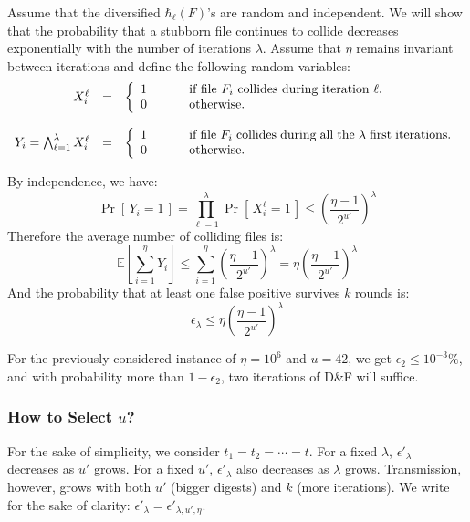 \documentclass{llncs}
\newcommand{\Prob}[1]{{\Pr\left[\,{#1}\,\right]}}
\newcommand{\EE}[1]{{\mathbb{E}\left[{#1}\right]}}
\newcommand{\df}{D\&F\xspace}
\begin{document}
Assume that the diversified $\hbar_\ell(F)$'s are random and independent. 
We will show that the probability that a stubborn file continues to collide decreases exponentially with the number of iterations $\lambda$. Assume that $\eta$ remains invariant between iterations and define the following random variables:
\[
\begin{array}{rcl}
X^{\ell}_i & = &
\left\{
\begin{array}{lcl}
1 & ~~~~&  \parbox[t]{.6\textwidth}{if file $F_i$ collides during iteration $\ell$.}\\
0 & ~~~~&  \mbox{otherwise.}
\end{array}
\right.\\
\\
Y_i = \bigwedge_{\ell=1}^\lambda X^{\ell}_i & = &
\left\{
\begin{array}{lcl}
1 & ~~~~&  \parbox[t]{.6\textwidth}{if file $F_i$ collides during all the $\lambda$ first iterations.}\\
0 & ~~~~&  \mbox{otherwise.}
\end{array}
\right.
\end{array}\]


By independence, we have:
\[
  \Prob{Y_i = 1} = \prod_{\ell=1}^\lambda \Prob{X^{\ell}_i = 1} \le \left( \frac{\eta -1}{2^{u'}} \right)^\lambda
\]
Therefore the average number of colliding files is:
\[
  \EE{\sum_{i=1}^{\eta} Y_i} \le \sum_{i=1}^{\eta} \left( \frac{\eta -1}{2^{u'}} \right)^\lambda =  \eta \left(\frac{\eta - 1}{2^{u'}}\right)^\lambda
\]
And the probability that at least one false positive survives $k$ rounds is:
\[
  \epsilon_\lambda \le \eta \left(\frac{\eta - 1}{2^{u'}}\right)^\lambda
\]

For the previously considered instance of $\eta=10^6$ and $u=42$, we get $\epsilon_2 \le 10^{-3} \%$, and with probability more than $1-\epsilon_2$, two iterations of \df will suffice.



\subsubsection{How to Select $u$?}

For the sake of simplicity, we consider $t_1=t_2=\cdots=t$.
For a fixed $\lambda$, $\epsilon'_\lambda$ decreases as $u'$ grows. For a fixed $u'$, $\epsilon'_\lambda$ also decreases as $\lambda$ grows. Transmission, however, grows with both $u'$ (bigger digests) and $k$ (more iterations). We write for the sake of clarity: $\epsilon'_\lambda = \epsilon'_{\lambda,u',\eta}$.
\end{document}
